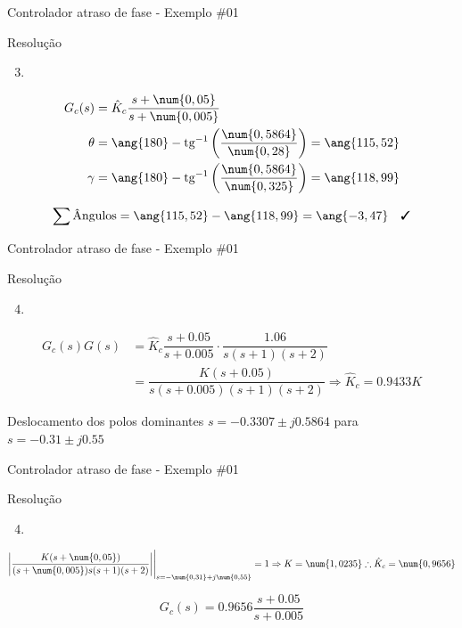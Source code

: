 \begin{frame}{Controlador atraso de fase - Exemplo \#01}
\begin{block}{Resolução}
\begin{enumerate}
	\setcounter{enumi}{2}
	\item
\end{enumerate}
\begin{minipage}{0.35\linewidth}
	\centering
	
	\scalebox{0.7}{}
\end{minipage}
\hfill
\begin{minipage}{0.6\linewidth}
	\begin{align*}
		G_c(s)&=\hat{K}_c\dfrac{s+\num{0,05}}{s+\num{0,005}}\\
		\theta&=\ang{180}-\tg^{-1}\left( \dfrac{\num{0,5864}}{\num{0,28}} \right) =\ang{115,52}\\
		\gamma&=\ang{180}-\tg^{-1}\left( \dfrac{\num{0,5864}}{\num{0,325}} \right) =\ang{118,99}
	\end{align*}
\end{minipage}
\[ \sum \text{Ângulos}=\ang{115,52}-\ang{118,99}=\ang{-3,47}\quad\text{\cmark} \]
\end{block}
\end{frame}


\begin{frame}{Controlador atraso de fase - Exemplo \#01}
\begin{block}{Resolução}
\begin{enumerate}
	\setcounter{enumi}{3}
	\item
\end{enumerate}

\begin{align*}
	G_c(s)G(s)&=\hat{K}_c\dfrac{s+\num{0,05}}{s+\num{0,005}}\cdot\dfrac{\num{1,06}}{s(s+1)(s+2)}\\
			  &=\dfrac{K(s+\num{0,05})}{s(s+\num{0,005})(s+1)(s+2)}\Rightarrow \hat{K}_c=\num{0,9433}K
\end{align*}

Deslocamento dos polos dominantes $ s=-\num{0,3307}\pm j\num{0,5864} $ para $ s=-\num{0,31}\pm j\num{0,55} $

\end{block}
\end{frame}


\begin{frame}{Controlador atraso de fase - Exemplo \#01}
	\begin{block}{Resolução}
		\begin{enumerate}
			\setcounter{enumi}{3}
			\item
		\end{enumerate}
		
		\[ \eval{\left| \dfrac{K(s+\num{0,05})}{(s+\num{0,005})s(s+1)(s+2)} \right|}_{s=-\num{0,31}+j\num{0,55}}=1\Rightarrow K=\num{1,0235}\therefore \hat{K}_c=\num{0,9656} \]
		
		\[ \boxed{G_c(s)=\num{0,9656}\dfrac{s+\num{0,05}}{s+\num{0,005}}} \]
	\end{block}
\end{frame}

